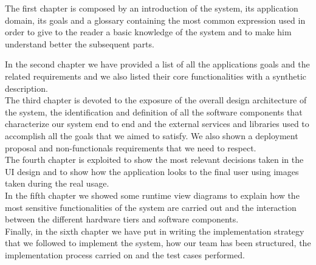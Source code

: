 The first chapter is composed by an introduction of the system, its application domain, its goals and a glossary containing the most common expression used in order to give to the reader a basic knowledge of the system and to make him understand better the subsequent parts.\\\par
In the second chapter we have provided a list of all the applications goals and the related requirements and we also listed their core functionalities with a synthetic description.\\

The third chapter is devoted to the exposure of the overall design architecture of the system, the identification and definition of all the software components that characterize our system end to end and the external services and libraries used to accomplish all the goals that we aimed to satisfy. We also shown a deployment proposal and non-functionals requirements that we need to respect.\\

The fourth chapter is exploited to show the most relevant decisions taken in the UI design and to show how the application looks to the final user using images taken during the real usage.\\

In the fifth chapter we showed some runtime view diagrams to explain how the most sensitive functionalities of the system are carried out and the interaction between the different hardware tiers and software components.\\

Finally, in the sixth chapter we have put in writing the implementation strategy that we followed to implement the system, how our team has been structured, the implementation process carried on and the test cases performed. 
	
	
	
